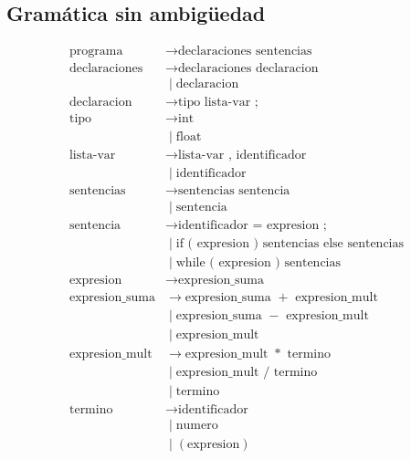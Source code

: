 \documentclass{article}
\begin{document}
\subsection*{Gramática sin ambigüedad}

\begin{align*}
\text{programa} &\rightarrow \text{declaraciones sentencias} \\
\text{declaraciones} &\rightarrow \text{declaraciones declaracion} \\
                     &\;|\; \text{declaracion} \\
\text{declaracion} &\rightarrow \text{tipo lista-var ;} \\
\text{tipo} &\rightarrow \text{int} \\
            &\;|\; \text{float} \\
\text{lista-var} &\rightarrow \text{lista-var , identificador} \\
                 &\;|\; \text{identificador} \\
\text{sentencias} &\rightarrow \text{sentencias sentencia} \\
                  &\;|\; \text{sentencia} \\
\text{sentencia} &\rightarrow \text{identificador = expresion ;} \\
                 &\;|\; \text{if ( expresion ) sentencias else sentencias} \\
                 &\;|\; \text{while ( expresion ) sentencias} \\
\text{expresion} &\rightarrow \text{expresion\_suma} \\
\text{expresion\_suma} &\rightarrow \text{expresion\_suma } + \text{ expresion\_mult} \\
                      &\;|\; \text{expresion\_suma } - \text{ expresion\_mult} \\
                      &\;|\; \text{expresion\_mult} \\
\text{expresion\_mult} &\rightarrow \text{expresion\_mult } * \text{ termino} \\
                      &\;|\; \text{expresion\_mult } / \text{ termino} \\
                      &\;|\; \text{termino} \\
\text{termino} &\rightarrow \text{identificador} \\
               &\;|\; \text{numero} \\
               &\;|\; ( \text{expresion} ) \\
\end{align*}\\\\
\end{document}
